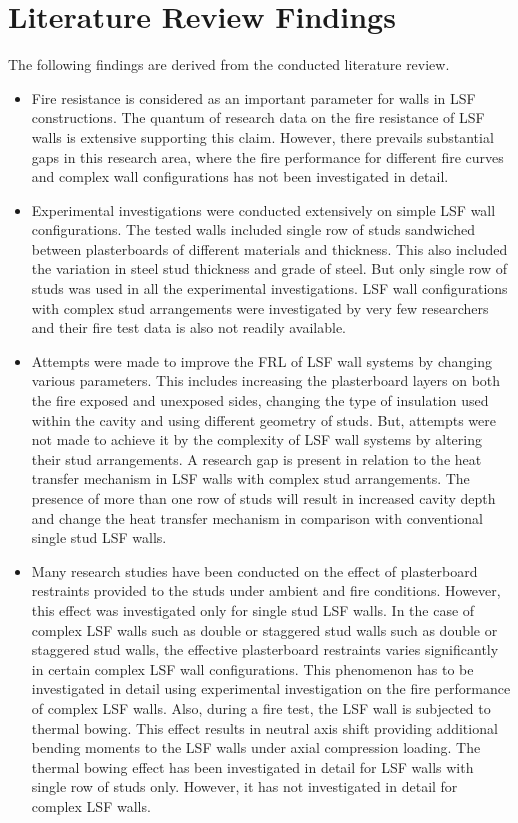 \section{Literature Review Findings}
The following findings are derived from the conducted literature review.
\begin{itemize}
	\item Fire resistance is considered as an important parameter for walls in LSF constructions. The quantum of research data on the fire resistance of LSF walls is extensive supporting this claim. However, there prevails substantial gaps in this research area, where the fire performance for different fire curves and complex wall configurations has not been investigated in detail. 
	\item Experimental investigations were conducted extensively on simple LSF wall configurations. The tested walls included single row of studs sandwiched between plasterboards of different materials and thickness. This also included the variation in steel stud thickness and grade of steel. But only single row of studs was used in all the experimental investigations. LSF wall configurations with complex stud arrangements were investigated by very few researchers and their fire test data is also not readily available.
	\item Attempts were made to improve the FRL of LSF wall systems by changing various parameters. This includes increasing the plasterboard layers on both the fire exposed and unexposed sides, changing the type of insulation used within the cavity and using different geometry of studs. But, attempts were not made to achieve it by the complexity of LSF wall systems by altering their stud arrangements. A research gap is present in relation to the heat transfer mechanism in LSF walls with complex stud arrangements. The presence of more than one row of studs will result in increased cavity depth and change the heat transfer mechanism in comparison with conventional single stud LSF walls.
	\item Many research studies have been conducted on the effect of plasterboard restraints provided to the studs under ambient and fire conditions. However, this effect was investigated only for single stud LSF walls. In the case of complex LSF walls such as double or staggered stud walls such as double or staggered stud walls, the effective plasterboard restraints varies significantly in certain complex LSF wall configurations. This phenomenon has to be investigated in detail using experimental investigation on the fire performance of complex LSF walls. Also, during a fire test, the LSF wall is subjected to thermal bowing. This effect results in neutral axis shift providing additional bending moments to the LSF walls under axial compression loading. The thermal bowing effect has been investigated in detail for LSF walls with single row of studs only. However, it has not investigated in detail for complex LSF walls.    

\end{itemize}

